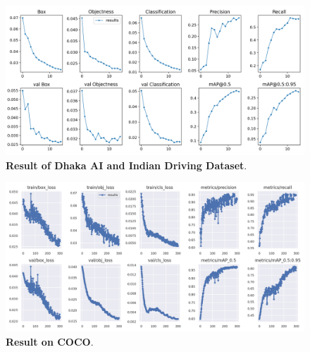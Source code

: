 \begin{figure}[H] %
  \centering
  \includegraphics[width=\textwidth]{figures/paper/results.png}
  \caption[The Architecture]{\textbf{Result of Dhaka AI and Indian Driving Dataset}. }
  \label{fig:figures/paper/results}
\end{figure}

\begin{figure}[H] %
  \centering
  \includegraphics[width=\textwidth]{figures/paper/yolo-on-coco.png}
  \caption[The Architecture]{\textbf{Result on COCO}. }
  \label{fig:figures/paper/yolo-on-coco}
\end{figure}



{}
\specialsection %
\headerspecialsection

{\hypersetup{urlcolor=ntnu,linkcolor=sophia} %

  
}
